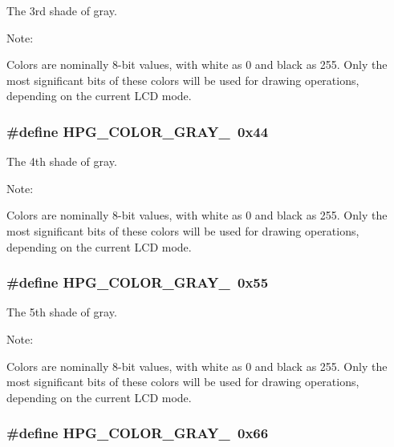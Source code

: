 The 3rd shade of gray.

\begin{Desc}
\item[Note: ]\par
Colors are nominally 8-bit values, with white as 0 and black as 255. Only the most significant bits of these colors will be used for drawing operations, depending on the current LCD mode. \end{Desc}
\subsubsection{\setlength{\rightskip}{0pt plus 5cm}\#define HPG\_\-COLOR\_\-GRAY\_\ 0x44}\label{hpgraphics_8h_a6}


The 4th shade of gray.

\begin{Desc}
\item[Note: ]\par
Colors are nominally 8-bit values, with white as 0 and black as 255. Only the most significant bits of these colors will be used for drawing operations, depending on the current LCD mode. \end{Desc}
\subsubsection{\setlength{\rightskip}{0pt plus 5cm}\#define HPG\_\-COLOR\_\-GRAY\_\ 0x55}\label{hpgraphics_8h_a7}


The 5th shade of gray.

\begin{Desc}
\item[Note: ]\par
Colors are nominally 8-bit values, with white as 0 and black as 255. Only the most significant bits of these colors will be used for drawing operations, depending on the current LCD mode. \end{Desc}
\subsubsection{\setlength{\rightskip}{0pt plus 5cm}\#define HPG\_\-COLOR\_\-GRAY\_\ 0x66}\label{hpgraphics_8h_a8}


